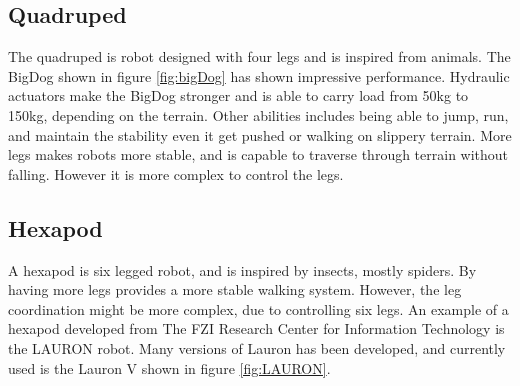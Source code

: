 \documentclass[USenglish]{ifimaster}  %
\begin{document}
\subsection{Quadruped}
The quadruped is robot designed with four legs and is inspired from animals. The BigDog \cite{Raibert200810822} shown in figure \ref{fig:bigDog} has shown impressive performance. Hydraulic actuators make the BigDog stronger and is able to carry load from 50kg to 150kg, depending on the terrain. Other abilities includes being able to jump, run, and maintain the stability even it get pushed or walking on slippery terrain. More legs makes robots more stable, and is capable to traverse through terrain without falling. However it is more complex to control the legs.

\subsection{Hexapod}
A hexapod is six legged robot, and is inspired by insects, mostly spiders. By having more legs provides a more stable walking system. However, the leg coordination might be more complex, due to controlling six legs. An example of a hexapod developed from The FZI Research Center for Information Technology is the LAURON robot. Many versions of Lauron has been developed, and currently used is the Lauron V shown in figure \ref{fig:LAURON}. 
\end{document}
